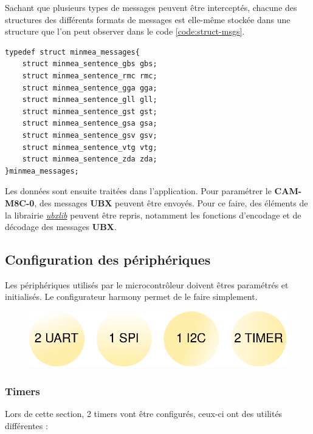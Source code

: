 Sachant que plusieurs types de messages peuvent être interceptés, chacune des structures des différents formats de messages est elle-même stockée dans une structure que l'on peut observer dans le code \ref{code:struct-msgs}.

\begin{code}
\caption{Structures messages.}
\label{code:struct-msgs}
\vspace*{-3mm}
\begin{verbatim}
typedef struct minmea_messages{
	struct minmea_sentence_gbs gbs;
	struct minmea_sentence_rmc rmc;
	struct minmea_sentence_gga gga;
	struct minmea_sentence_gll gll;
	struct minmea_sentence_gst gst;
	struct minmea_sentence_gsa gsa;
	struct minmea_sentence_gsv gsv;
	struct minmea_sentence_vtg vtg;
	struct minmea_sentence_zda zda;
}minmea_messages;
\end{verbatim}
\end{code}

Les données sont ensuite traitées dans l'application. Pour paramétrer le \textbf{CAM-M8C-0}, des messages \textbf{UBX} peuvent être envoyés. Pour ce faire, des éléments de la librairie \href{https://github.com/u-blox/ubxlib}{\textit{ubxlib}} peuvent être repris, notamment les fonctions d'encodage et de décodage des messages \textbf{UBX}.



\subsection{Configuration des périphériques}
Les périphériques utilisés par le microcontrôleur doivent êtres paramétrés et initialisés. Le configurateur \gls{harmony} permet de le faire simplement.

\begin{figure}[h]
	\centering
	\includegraphics[width=.5\linewidth]{../figures/code/périphériques}
\end{figure}

\clearpage

\subsubsection{Timers}
Lors de cette section, 2 timers vont être configurés, ceux-ci ont des utilités différentes :

